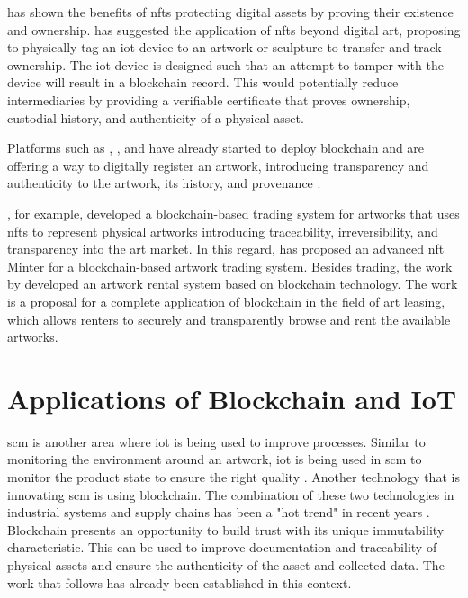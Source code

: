 \textcite{nftopportunities} has shown the benefits of \glspl{nft} protecting digital assets by proving their existence and ownership. \textcite{creativeindustry} has suggested the application of \glspl{nft} beyond digital art, proposing to physically tag an \gls{iot} device to an artwork or sculpture to transfer and track ownership. The \gls{iot} device is designed such that an attempt to tamper with the device will result in a blockchain record. This would potentially reduce intermediaries by providing a verifiable certificate that proves ownership, custodial history, and authenticity of a physical asset.

Platforms such as \textcite{artory}, \textcite{4art}, and \textcite{verisart} have already started to deploy blockchain and are offering a way to digitally register an artwork, introducing transparency and authenticity to the artwork, its history, and provenance \cite{bcartmarket}.


\textcite{artchain}, for example, developed a blockchain-based trading system for artworks that uses \glspl{nft} to represent physical artworks introducing traceability, irreversibility, and transparency into the art market. In this regard, \textcite{nftminter} has proposed an advanced \gls{nft} Minter for a blockchain-based artwork trading system. Besides trading, the work by \textcite{artrentalblockchain} developed an artwork rental system based on blockchain technology. The work is a proposal for a complete application of blockchain in the field of art leasing, which allows renters to securely and transparently browse and rent the available artworks.
 
\section{Applications of Blockchain and IoT}
\gls{scm} is another area where \gls{iot} is being used to improve processes. Similar to monitoring the environment around an artwork, \gls{iot} is being used in \gls{scm} to monitor the product state to ensure the right quality \cite{iotsupplychains}. Another technology that is innovating \gls{scm} is using blockchain. The combination of these two technologies in industrial systems and supply chains has been a "hot trend" in recent years \cite{industryiot}. Blockchain presents an opportunity to build trust with its unique immutability characteristic. This can be used to improve documentation and traceability of physical assets and ensure the authenticity of the asset and collected data. The work that follows has already been established in this context.

